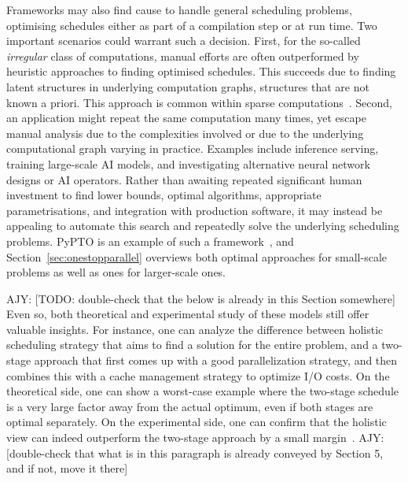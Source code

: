 \documentclass[oneside,reqno, a4paper]{amsart}
\numberwithin{equation}{section}
\newcommand{\ajy}[1]{{\color{orange} \sf AJY: [#1]}}
\begin{document}
Frameworks may also find cause to handle general scheduling problems,
optimising schedules either as part of a compilation step or at run time.
Two important scenarios could warrant such a decision.
First,
for the so-called \emph{irregular} class of computations,
manual efforts are often outperformed by heuristic approaches to finding optimised schedules.
This succeeds due to finding latent structures in underlying computation graphs,
structures that are not known a priori.
This approach is common within sparse computations~\cite{bisseling12}.
Second,
an application might repeat the same computation many times,
yet escape manual analysis due to the complexities involved or due to the underlying computational graph varying in practice.
Examples include inference serving,
training large-scale AI models,
and investigating alternative neural network designs or AI operators.
Rather than awaiting repeated significant human investment to find
lower bounds,
optimal algorithms,
appropriate parametrisations,
and integration with production software,
it may instead be appealing to automate this search and repeatedly solve the underlying scheduling problems.
PyPTO is an example of such a framework~\cite{pypto_gitcode}, and
Section~\ref{sec:onestopparallel} overviews both optimal approaches for small-scale problems as well as ones for larger-scale ones.

%
%

\ajy{TODO: double-check that the below is already in this Section somewhere}
Even so, both theoretical and experimental study of these models still offer valuable insights. For instance, one can analyze the difference between holistic scheduling strategy that aims to find a solution for the entire problem, and a two-stage approach that first comes up with a good parallelization strategy, and then combines this with a cache management strategy to optimize I/O costs. On the theoretical side, one can show a worst-case example where the two-stage schedule is a very large factor away from the actual optimum, even if both stages are optimal separately. On the experimental side, one can confirm that the holistic view can indeed outperform the two-stage approach by a small margin~\cite{multiBSP_opdas}.
\ajy{double-check that what is in this paragraph is already conveyed by Section 5, and if not, move it there}
\end{document}
